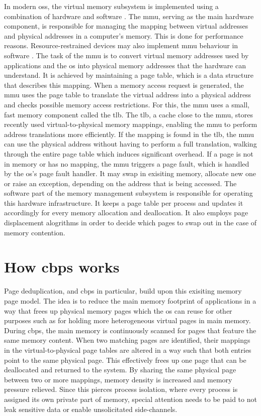 In modern \acp{os}, the virtual memory subsystem is implemented using a combination of hardware and software \cite{mos2009}.
The \ac{mmu}, serving as the main hardware component, is responsible for managing the mapping between virtual addresses and physical addresses in a computer's memory.
This is done for performance reasons.
Resource-restrained devices may also implement \ac{mmu} behaviour in software \cite{sw-mmu2005}.
The task of the \ac{mmu} is to convert virtual memory addresses used by applications and the \ac{os} into physical memory addresses that the hardware can understand.
It is achieved by maintaining a page table, which is a data structure that describes this mapping.
When a memory access request is generated, the \ac{mmu} uses the page table to translate the virtual address into a physical address and checks possible memory access restrictions.
For this, the \ac{mmu} uses a small, fast memory component called the \ac{tlb}.
The \ac{tlb}, a cache close to the \ac{mmu}, stores recently used virtual-to-physical memory mappings, enabling the \ac{mmu} to perform address translations more efficiently.
If the mapping is found in the \ac{tlb}, the \ac{mmu} can use the physical address without having to perform a full translation, walking through the entire page table which induces significant overhead.
If a page is not in memory or has no mapping, the \ac{mmu} triggers a page fault, which is handled by the \ac{os}'s page fault handler.
It may swap in exisiting memory, allocate new one or raise an exception, depending on the address that is being accessed.
The software part of the memory management subsystem is responsible for operating this hardware infrastructure.
It keeps a page table per process and updates it accordingly for every memory allocation and deallocation.
It also employs page displacement alogrithms in order to decide which pages to swap out in the case of memory contention.

\section{How \acs{cbps} works}
\label{sec:how-cbps-works}

Page deduplication, and \ac{cbps} in particular, build upon this exisiting memory page model.
The idea is to reduce the main memory footprint of applications in a way that frees up physical memory pages which the \ac{os} can reuse for other purposes such as for holding more heterogeneous virtual pages in main memory.
During \ac{cbps}, the main memory is continuously scanned for pages that feature the same memory content.
When two matching pages are identified, their mappings in the virtual-to-physical page tables are altered in a way such that both entries point to the same physical page.
This effectively frees up one page that can be deallocated and returned to the system.
By sharing the same physical page between two or more mappings, memory density is increased and memory pressure relieved.
Since this pierces process isolation, where every process is assigned its own private part of memory, special attention needs to be paid to not leak sensitive data or enable unsolicitated side-channels.
